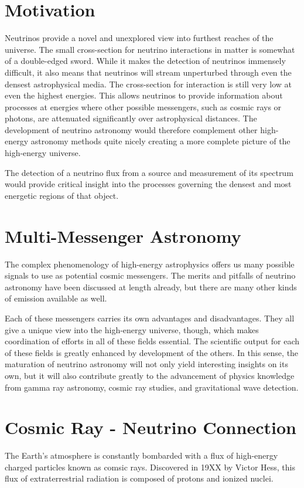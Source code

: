 \documentclass{gatech-thesis}
\begin{document}
\section{Motivation}
Neutrinos provide a novel and unexplored view into furthest reaches of the universe. The small cross-section for neutrino interactions in matter is somewhat of a double-edged sword. While it makes the detection of neutrinos immensely difficult, it also means that neutrinos will stream unperturbed through even the densest astrophysical media. The cross-section for interaction is still very low at even the highest energies. This allows neutrinos to provide information about processes at energies where other possible messengers, such as cosmic rays or photons, are attenuated significantly over astrophysical distances. The development of neutrino astronomy would therefore complement other high-energy astronomy methods quite nicely creating a more complete picture of the high-energy universe.



The detection of a neutrino flux from a source and measurement of its spectrum would provide critical insight into the processes governing the densest and most energetic regions of that object.

\section{Multi-Messenger Astronomy}
The complex phenomenology of high-energy astrophysics offers us many possible signals to use as potential cosmic messengers. The merits and pitfalls of neutrino astronomy have been discussed at length already, but there are many other kinds of emission available as well.

 Each of these messengers carries its own advantages and disadvantages. They all give a unique view into the high-energy universe, though, which makes coordination of efforts in all of these fields essential. The scientific output for each of these fields is greatly enhanced by development of the others. In this sense, the maturation of neutrino astronomy will not only yield interesting insights on its own, but it will also contribute greatly to the advancement of physics knowledge from gamma ray astronomy, cosmic ray studies, and gravitational wave detection.
\section{Cosmic Ray - Neutrino Connection}
The Earth's atmosphere is constantly bombarded with a flux of high-energy charged particles known as comsic rays. Discovered in 19XX by Victor Hess, this flux of extraterrestrial radiation is composed of protons and ionized nuclei.
\end{document}
